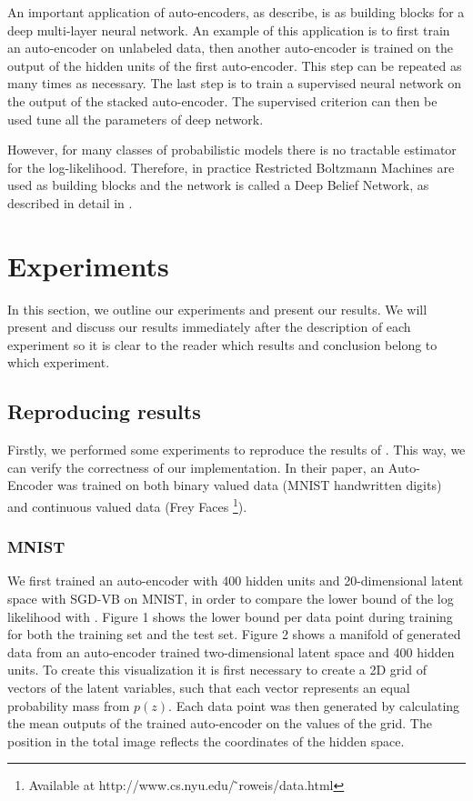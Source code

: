 \documentclass{article}
\begin{document}
An important application of auto-encoders, as \cite{bengio2009learning} describe, is as building blocks for a deep multi-layer neural network. An example of this application is to first train an auto-encoder on unlabeled data, then another auto-encoder is trained on the output of the hidden units of the first auto-encoder. This step can be repeated as many times as necessary. The last step is to train a supervised neural network on the output of the stacked auto-encoder. The supervised criterion can then be used tune all the parameters of deep network. 

However, for many classes of probabilistic models there is no tractable estimator for the log-likelihood. Therefore, in practice Restricted Boltzmann Machines are used as building blocks and the network is called a Deep Belief Network, as described in detail in \cite{hinton2006reducing}.


\section{Experiments}

In this section, we outline our experiments and present our results. We will present and discuss our results immediately after the description of each experiment so it is clear to the reader which results and conclusion belong to which experiment.

\subsection{Reproducing results}

Firstly, we performed some experiments to reproduce the results of \cite{kingma2013auto}. This way, we can verify the correctness of our implementation. In their paper, an Auto-Encoder was trained on both binary valued data (MNIST handwritten digits) and continuous valued data (Frey Faces \footnote{Available at http://www.cs.nyu.edu/ ̃roweis/data.html}).

\subsubsection{MNIST}

We first trained an auto-encoder with 400 hidden units and 20-dimensional latent space with SGD-VB on MNIST, in order to compare the lower bound of the log likelihood with \cite{kingma2013auto}. Figure 1 shows the lower bound per data point during training for both the training set and the test set. Figure 2 shows a manifold of generated data from an auto-encoder trained two-dimensional latent space and 400 hidden units. To create this visualization it is first necessary to create a 2D grid of vectors of the latent variables, such that each vector represents an equal probability mass from $p(z)$. Each data point was then generated by calculating the mean outputs of the trained auto-encoder on the values of the grid. The position in the total image reflects the coordinates of the hidden space. \\ 
\end{document}
